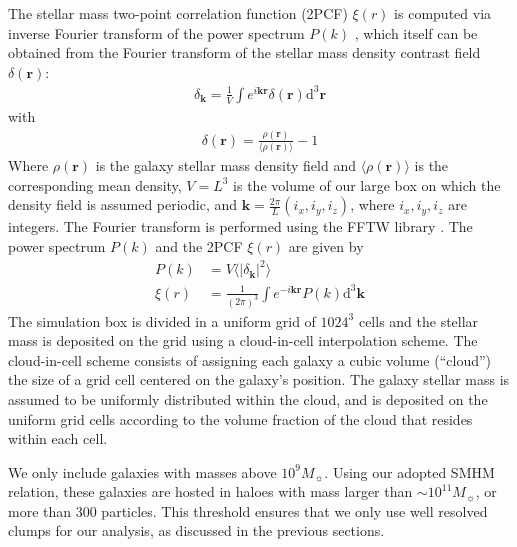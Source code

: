 \documentclass[a4paper,twocolumn,fleqn,usenatbib]{mnras}
\newcommand{\de}{\mathrm{d}}
\newcommand{\msol}{M_{\sun}}
\begin{document}
The  stellar mass  two-point correlation  function (2PCF)  $\xi(r)$ is
computed via  inverse Fourier transform  of the power  spectrum $P(k)$
\citep[e.g.][]{Mo},  which itself  can  be obtained  from the  Fourier
transform    of   the    stellar   mass    density   contrast    field
$\delta(\mathbf{r})$:
%
\begin{align}
  \delta_\mathbf{k} = \frac{1}{V}\int e^{i\mathbf{kr}} \delta(\mathbf{r}) \de ^3 \mathbf{r}
\end{align}
%
with
%
\begin{align}
	\delta(\mathbf{r}) = \frac{\rho(\mathbf{r})}{\langle \rho(\mathbf{r}) \rangle } - 1
\end{align}
%
Where $\rho(\mathbf{r})$ is the galaxy  stellar mass density field and
$\langle \rho(\mathbf{r}) \rangle$ is  the corresponding mean density,
$V = L^3$ is the volume of our large box on which the density field is
assumed  periodic,  and  $\mathbf{k}=\frac{2\pi}{L}(i_x,  i_y,  i_z)$,
where  $i_x,  i_y,  i_z$  are  integers.   The  Fourier  transform  is
performed using  the FFTW library \citep{FFTW05}.   The power spectrum
$P(k)$ and the 2PCF $\xi(r)$ are given by
%
\begin{align}
  P(k)    &= V \langle |\delta_\mathbf{k}|^2 \rangle \\
  \xi(r)  &= \frac{1}{(2\pi)^3} \int e^{-i\mathbf{kr}} P(k) \de^3 \mathbf{k} 
\end{align}
The simulation box is divided in  a uniform grid of $1024^3$ cells and
the  stellar mass  is  deposited  on the  grid  using a  cloud-in-cell
interpolation scheme.  The cloud-in-cell scheme consists  of assigning
each  galaxy a  cubic  volume  (``cloud'') the  size  of  a grid  cell
centered on the galaxy's position.  The galaxy stellar mass is assumed
to be uniformly distributed within the  cloud, and is deposited on the
uniform grid cells according to the  volume fraction of the cloud that
resides within each cell.

We only  include galaxies with  masses above $10^9 \msol$.   Using our
adopted SMHM relation,  these galaxies are hosted in  haloes with mass
larger than  $\sim 10^{11} \msol$,  or more than 300  particles.  This
threshold  ensures that  we  only  use well  resolved  clumps for  our
analysis, as discussed in the previous sections.
\end{document}
